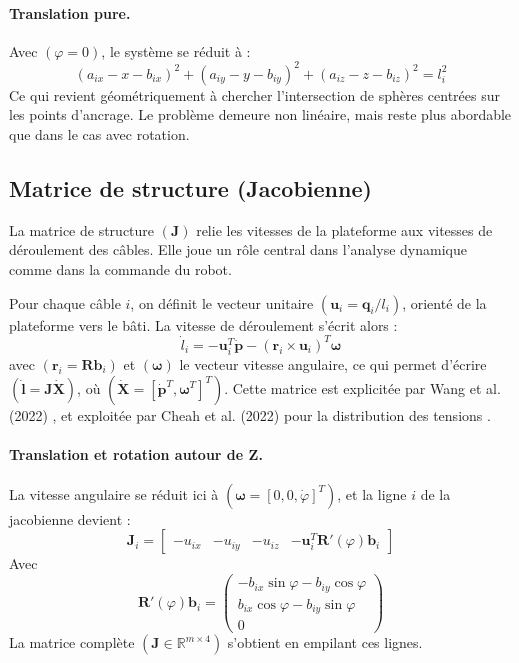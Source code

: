 \paragraph{Translation pure.}
Avec $(\varphi = 0)$, le système se réduit à :
\begin{equation}
(a_{ix}-x-b_{ix})^2 + (a_{iy}-y-b_{iy})^2 + (a_{iz}-z-b_{iz})^2 = l_i^2
\end{equation}
Ce qui revient géométriquement à chercher l'intersection de sphères centrées sur les points d'ancrage. Le problème demeure non linéaire, mais reste plus abordable que dans le cas avec rotation.

\subsection{Matrice de structure (Jacobienne)}

La matrice de structure $(\mathbf{J})$ relie les vitesses de la plateforme aux vitesses de déroulement des câbles. Elle joue un rôle central dans l'analyse dynamique comme dans la commande du robot.

Pour chaque câble $i$, on définit le vecteur unitaire $(\mathbf{u}_i = \mathbf{q}_i / l_i)$, orienté de la plateforme vers le bâti. La vitesse de déroulement s'écrit alors :
\begin{equation}
\dot{l}_i = -\mathbf{u}_i^T\dot{\mathbf{p}} - (\mathbf{r}_i \times \mathbf{u}_i)^T \boldsymbol{\omega}
\label{eq:ldot}
\end{equation}
avec $(\mathbf{r}_i = \mathbf{R}\mathbf{b}_i)$ et $(\boldsymbol{\omega})$ le vecteur vitesse angulaire, ce qui permet d'écrire $(\dot{\mathbf{l}} = \mathbf{J}\dot{\mathbf{X}})$, où $(\dot{\mathbf{X}} = [\dot{\mathbf{p}}^T, \boldsymbol{\omega}^T]^T)$. Cette matrice est explicitée par Wang et al. (2022) \cite{mdpi2022}, et exploitée par Cheah et al. (2022) pour la distribution des tensions \cite{arXiv2403}.

\paragraph{Translation et rotation autour de Z.}
La vitesse angulaire se réduit ici à $(\boldsymbol{\omega} = [0, 0, \dot{\varphi}]^T)$, et la ligne $i$ de la jacobienne devient :
\begin{equation}
\mathbf{J}_i = \begin{bmatrix} -u_{ix} & -u_{iy} & -u_{iz} & -\mathbf{u}_i^T \mathbf{R}'(\varphi)\mathbf{b}_i \end{bmatrix}
\end{equation}
Avec
\begin{equation}
\mathbf{R}'(\varphi)\mathbf{b}_i = \begin{pmatrix}
-b_{ix}\sin\varphi - b_{iy}\cos\varphi \\
b_{ix}\cos\varphi - b_{iy}\sin\varphi \\
0
\end{pmatrix}
\end{equation}
La matrice complète $(\mathbf{J} \in \mathbb{R}^{m \times 4})$ s'obtient en empilant ces lignes.

